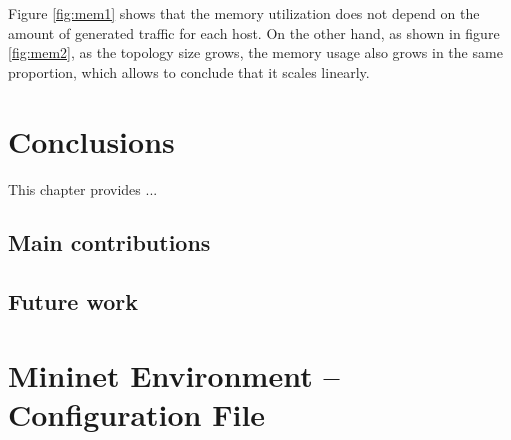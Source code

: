 \documentclass[12pt,english,oneside]{book}
\begin{document}
Figure \ref{fig:mem1} shows that the memory utilization does not depend on the amount of generated traffic for each host.
On the other hand, as shown in figure \ref{fig:mem2}, as the topology size grows, the memory usage also grows in the same proportion, which allows to conclude that it scales linearly.
\newpage

\chapter{Conclusions\label{cha:conclusions}}

This chapter provides ...

\section{Main contributions}

\section{Future work}

\appendix

\chapter{Mininet Environment -- Configuration File\label{app:minconf}}
\end{document}

